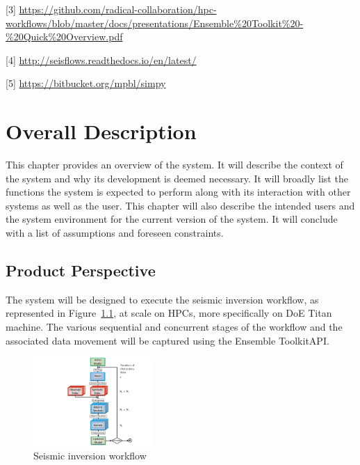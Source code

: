 \documentclass{scrreprt}
\def\entk{Ensemble Toolkit}
\begin{document}
[3] \url{https://github.com/radical-collaboration/hpc-workflows/blob/master/docs/presentations/Ensemble\%20Toolkit\%20-\%20Quick\%20Overview.pdf}

[4] \url{http://seisflows.readthedocs.io/en/latest/}

[5] \url{https://bitbucket.org/mpbl/simpy}


\chapter{Overall Description}

This chapter provides an overview of the system. It will describe the context of the system and why its development is deemed necessary. It will broadly list the functions the system is expected to perform along with its interaction with other systems as well as the user. This chapter will also describe the intended users and the system environment for the current version of the system. It will conclude with a list of assumptions and foreseen constraints.


\section{Product Perspective}

The system will be designed to execute the seismic inversion workflow, as represented in Figure~\ref{fig:seismic_wflow}, at scale on HPCs, more specifically on DoE Titan machine. The various sequential and concurrent stages of the workflow and the associated data movement will be captured using the \entk API.

\begin{figure}
\includegraphics[width=0.4\textwidth]{SeismicWorkflow.pdf}
\caption{Seismic inversion workflow}
\label{fig:seismic_wflow}
\end{figure}
\end{document}
